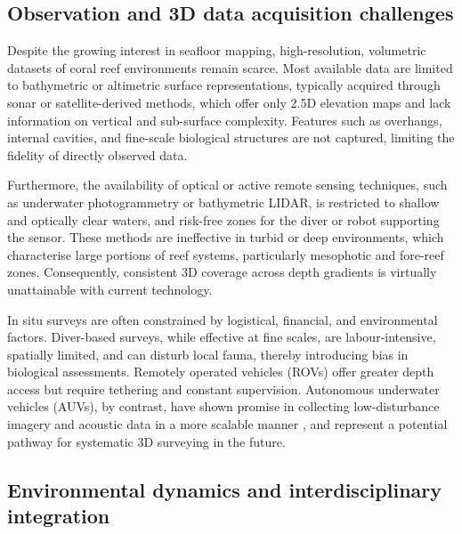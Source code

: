 \subsection{Observation and 3D data acquisition challenges}
Despite the growing interest in seafloor mapping, high-resolution, volumetric datasets of coral reef environments remain scarce. Most available data are limited to bathymetric or altimetric surface representations, typically acquired through sonar or satellite-derived methods, which offer only 2.5D elevation maps and lack information on vertical and sub-surface complexity. Features such as overhangs, internal cavities, and fine-scale biological structures are not captured, limiting the fidelity of directly observed data.

Furthermore, the availability of optical or active remote sensing techniques, such as underwater photogrammetry or bathymetric LIDAR, is restricted to shallow and optically clear waters, and risk-free zones for the diver or robot supporting the sensor. These methods are ineffective in turbid or deep environments, which characterise large portions of reef systems, particularly mesophotic and fore-reef zones. Consequently, consistent 3D coverage across depth gradients is virtually unattainable with current technology.

In situ surveys are often constrained by logistical, financial, and environmental factors. Diver-based surveys, while effective at fine scales, are labour-intensive, spatially limited, and can disturb local fauna, thereby introducing bias in biological assessments. Remotely operated vehicles (ROVs) offer greater depth access but require tethering and constant supervision. Autonomous underwater vehicles (AUVs), by contrast, have shown promise in collecting low-disturbance imagery and acoustic data in a more scalable manner \cite{GonzalezRivero2016,Modasshir2018}, and represent a potential pathway for systematic 3D surveying in the future.

\subsection{Environmental dynamics and interdisciplinary integration}

